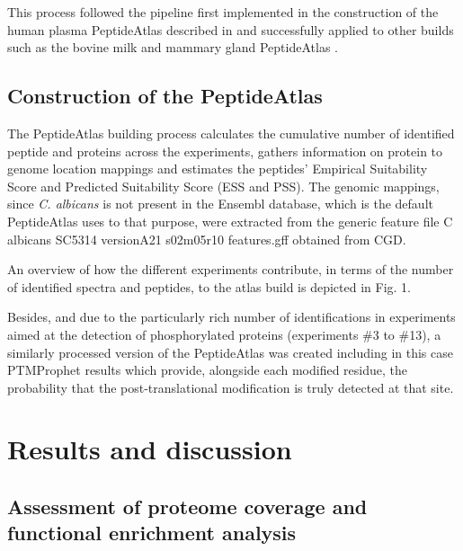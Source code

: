 This process followed the pipeline first implemented in the
construction of the human plasma PeptideAtlas described in
\citep{Farrah2011} and successfully applied to other builds such as the
bovine milk and mammary gland PeptideAtlas \citep{Bislev2012}.


\subsection*{Construction of the PeptideAtlas}

The PeptideAtlas building process calculates the cumulative
number of identified peptide and proteins across the experiments,
 gathers information on protein to genome location
mappings and estimates the peptides' Empirical Suitability
Score and Predicted Suitability Score (ESS and PSS). The genomic
mappings, since \textit{C. albicans} is not present in the Ensembl database,
 which is the default PeptideAtlas uses to that purpose, were
extracted from the generic feature file 
C albicans SC5314 versionA21 s02m05r10 features.gff
obtained from CGD.

An overview of how the different experiments contribute,
in terms of the number of identified spectra and peptides, to
the atlas build is depicted in Fig. 1.

Besides, and due to the particularly rich number of identifications
 in experiments aimed at the detection of phosphorylated proteins
  (experiments \#3 to \#13), a similarly processed
version of the PeptideAtlas was created including in this case
PTMProphet results which provide, alongside each modified
residue, the probability that the post-translational modification
is truly detected at that site.





\section*{Results and discussion}

\subsection*{Assessment of proteome coverage and functional enrichment analysis}

